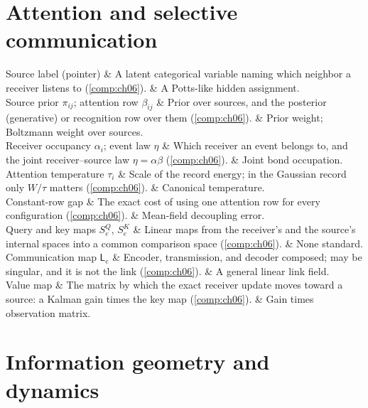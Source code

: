 \section*{Attention and selective communication}

\begin{decoder}
Source label (pointer) & A latent categorical variable naming which neighbor a receiver listens to (\cref{comp:ch06}). & A Potts-like hidden assignment. \\
Source prior $\pi_{ij}$; attention row $\beta_{ij}$ & Prior over sources, and the posterior (generative) or recognition row over them (\cref{comp:ch06}). & Prior weight; Boltzmann weight over sources. \\
Receiver occupancy $\alpha_i$; event law $\eta$ & Which receiver an event belongs to, and the joint receiver--source law $\eta=\alpha\beta$ (\cref{comp:ch06}). & Joint bond occupation. \\
Attention temperature $\tau_i$ & Scale of the record energy; in the Gaussian record only $W/\tau$ matters (\cref{comp:ch06}). & Canonical temperature. \\
Constant-row gap & The exact cost of using one attention row for every configuration (\cref{comp:ch06}). & Mean-field decoupling error. \\
Query and key maps $S^Q_e$, $S^K_e$ & Linear maps from the receiver's and the source's internal spaces into a common comparison space (\cref{comp:ch06}). & None standard. \\
Communication map $\mathsf L_e$ & Encoder, transmission, and decoder composed; may be singular, and it is not the link (\cref{comp:ch06}). & A general linear link field. \\
Value map & The matrix by which the exact receiver update moves toward a source: a Kalman gain times the key map (\cref{comp:ch06}). & Gain times observation matrix. \\
\end{decoder}

\section*{Information geometry and dynamics}

